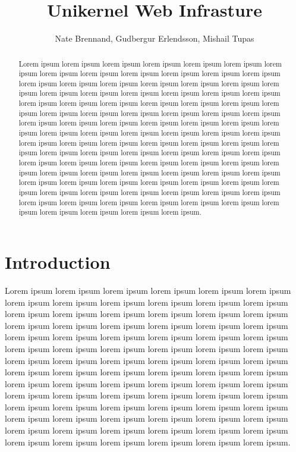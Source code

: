 \documentclass[10pt,twocolumn]{article}
\begin{document}
\title{Unikernel Web Infrasture}
\author{Nate Brennand, Gudbergur Erlendsson, Mishail Tupas}
\date{}
\maketitle
\thispagestyle{empty}

\begin{abstract}
Lorem ipsum lorem ipsum lorem ipsum lorem ipsum lorem ipsum lorem ipsum
lorem ipsum lorem ipsum lorem ipsum lorem ipsum lorem ipsum lorem ipsum
lorem ipsum lorem ipsum lorem ipsum lorem ipsum lorem ipsum lorem ipsum
lorem ipsum lorem ipsum lorem ipsum lorem ipsum lorem ipsum lorem ipsum
lorem ipsum lorem ipsum lorem ipsum lorem ipsum lorem ipsum lorem ipsum
lorem ipsum lorem ipsum lorem ipsum lorem ipsum lorem ipsum lorem ipsum
lorem ipsum lorem ipsum lorem ipsum lorem ipsum lorem ipsum lorem ipsum
lorem ipsum lorem ipsum lorem ipsum lorem ipsum lorem ipsum lorem ipsum
lorem ipsum lorem ipsum lorem ipsum lorem ipsum lorem ipsum lorem ipsum
lorem ipsum lorem ipsum lorem ipsum lorem ipsum lorem ipsum lorem ipsum
lorem ipsum lorem ipsum lorem ipsum lorem ipsum lorem ipsum lorem ipsum
lorem ipsum lorem ipsum lorem ipsum lorem ipsum lorem ipsum lorem ipsum
lorem ipsum lorem ipsum lorem ipsum lorem ipsum lorem ipsum lorem ipsum
lorem ipsum lorem ipsum lorem ipsum lorem ipsum lorem ipsum lorem ipsum
lorem ipsum lorem ipsum lorem ipsum lorem ipsum lorem ipsum lorem ipsum
lorem ipsum lorem ipsum lorem ipsum lorem ipsum lorem ipsum lorem ipsum
lorem ipsum lorem ipsum lorem ipsum lorem ipsum lorem ipsum lorem ipsum.
\end{abstract}

\section{Introduction}

Lorem ipsum lorem ipsum lorem ipsum lorem ipsum lorem ipsum lorem ipsum
lorem ipsum lorem ipsum lorem ipsum lorem ipsum lorem ipsum lorem ipsum
lorem ipsum lorem ipsum lorem ipsum lorem ipsum lorem ipsum lorem ipsum
lorem ipsum lorem ipsum lorem ipsum lorem ipsum lorem ipsum lorem ipsum
lorem ipsum lorem ipsum lorem ipsum lorem ipsum lorem ipsum lorem ipsum
lorem ipsum lorem ipsum lorem ipsum lorem ipsum lorem ipsum lorem ipsum
lorem ipsum lorem ipsum lorem ipsum lorem ipsum lorem ipsum lorem ipsum
lorem ipsum lorem ipsum lorem ipsum lorem ipsum lorem ipsum lorem ipsum
lorem ipsum lorem ipsum lorem ipsum lorem ipsum lorem ipsum lorem ipsum
lorem ipsum lorem ipsum lorem ipsum lorem ipsum lorem ipsum lorem ipsum
lorem ipsum lorem ipsum lorem ipsum lorem ipsum lorem ipsum lorem ipsum
lorem ipsum lorem ipsum lorem ipsum lorem ipsum lorem ipsum lorem ipsum
lorem ipsum lorem ipsum lorem ipsum lorem ipsum lorem ipsum lorem ipsum
lorem ipsum lorem ipsum lorem ipsum lorem ipsum lorem ipsum lorem ipsum.
\end{document}
